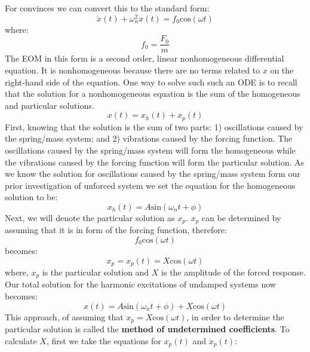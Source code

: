 \documentclass[12pt,letter]{article}
\numberwithin{ex}{section} %
\numberwithin{re}{section} %
\begin{document}
			For convinces we can convert this to the standard form:					
			\begin{equation}
				\ddot{x}(t)+\omega_n^2x(t) = f_0\text{cos}(\omega t)
			\end{equation}					
			where:
			\begin{equation}
				f_0 = \frac{F_0}{m}
			\end{equation}	
			The EOM in this form is a second order, linear nonhomogeneous differential equation. It is nonhomogeneous because there are no terms related to $x$ on the right-hand side of the equation. One way to solve such such an ODE is to recall that the solution for a nonhomogeneous equation is the sum of the homogeneous and particular solutions. 
			\begin{equation}
				x(t) = x_h(t) + x_p(t)
			\end{equation}	
			First, knowing that the solution is the sum of two parts: 1) oscillations caused by the spring/mass system; and 2) vibrations caused by the forcing function. The oscillations caused by the spring/mass system will form the homogeneous while the vibrations caused by the forcing function will form the particular solution. As we know the solution for oscillations caused by the spring/mass system form our prior investigation of unforced system we set the equation for the homogeneous solution to be:
			\begin{equation}
				x_h(t) = A\text{sin}(\omega_n t + \phi)
			\end{equation}			
			Next, we will denote the particular solution as $x_p$. $x_p$ can be determined by assuming that it is in form of the forcing function, therefore:
			\begin{equation}
				f_0\text{cos}(\omega t)
			\end{equation}	
			becomes:
			\begin{equation}
				x_p = x_p(t) =X\text{cos}(\omega t)
			\end{equation}						
			where, $x_p$ is the particular solution and $X$ is the amplitude of the forced response. Our total solution for the harmonic excitations of undamped systems now becomes:
			\begin{equation}
				x(t) = A\text{sin}(\omega_n t + \phi) + X\text{cos}(\omega t) 
			\end{equation}				
			This approach, of assuming that $x_p=X\text{cos}(\omega t)$, in order to determine the particular solution is called the \textbf{method of undetermined coefficients}. To calculate $X$, first we take the equations for $x_p(t)$ and $\ddot{x}_p(t) $:
\end{document}

